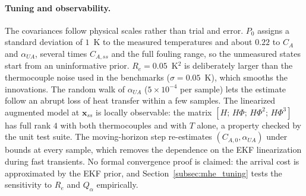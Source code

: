 \paragraph{Tuning and observability.} The covariances follow physical scales rather than trial and error. $P_0$ assigns a standard deviation of $1$~K to the measured temperatures and about $0.22$ to $C_A$ and $\alpha_{UA}$, several times $C_{A,ss}$ and the full fouling range, so the unmeasured states start from an uninformative prior. $R_e = 0.05$~K$^2$ is deliberately larger than the thermocouple noise used in the benchmarks ($\sigma = 0.05$~K), which smooths the innovations. The random walk of $\alpha_{UA}$ ($5 \times 10^{-4}$ per sample) lets the estimate follow an abrupt loss of heat transfer within a few samples. The linearized augmented model at $\mathbf{x}_{ss}$ is locally observable: the matrix $[H;\, H\Phi;\, H\Phi^2;\, H\Phi^3]$ has full rank $4$ with both thermocouples and with $T$ alone, a property checked by the unit test suite. The moving-horizon step re-estimates $(C_{A,0}, \alpha_{UA})$ under bounds at every sample, which removes the dependence on the EKF linearization during fast transients. No formal convergence proof is claimed: the arrival cost is approximated by the EKF prior, and Section~\ref{subsec:mhe_tuning} tests the sensitivity to $R_e$ and $Q_\alpha$ empirically.
